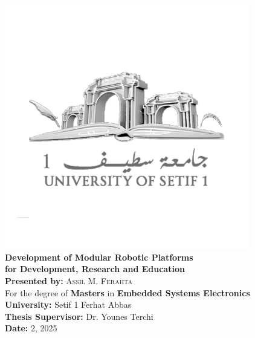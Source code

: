 \documentclass[12pt,a4paper]{scrreport}
\begin{document}
\begin{titlepage}
    \centering
    \includegraphics[width=0.8\textwidth]{Figures/LOGO-UFAS1-2020.png} %
    \\
    {\LARGE \textbf{Development of Modular Robotic Platforms}}\\[1cm]
    {\Large \textbf{for Development, Research and Education}}\\[2cm]
    \textbf{Presented by:} \textsc{Assil M. Ferahta}\\
    For the degree of \textbf{Masters} in \textbf{Embedded Systems Electronics}\\[1cm]
    \textbf{University:} Setif 1 Ferhat Abbas\\
    \textbf{Thesis Supervisor:} Dr. Younes Terchi\\
    \textbf{Date:} 2, 2025\\[2cm]

    \vfill
\end{titlepage}




\tableofcontents
\newpage











\printbibliography
\end{document}
